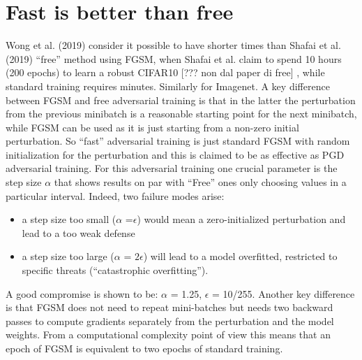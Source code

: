 \documentclass{article}
\begin{document}
\section{Fast is better than free}

Wong et al. (2019) consider it possible to have shorter times than Shafai et al. (2019) “free” method using FGSM,  when Shafai et al. claim to spend 10 hours (200 epochs) to learn a robust CIFAR10 [??? non dal paper di free] , while standard training requires minutes. Similarly for Imagenet.  
A key difference between FGSM and free adversarial training is that in the latter the perturbation from the previous minibatch is a reasonable starting point for the next minibatch, while FGSM can be used as it is just starting from a non-zero initial perturbation.
So “fast” adversarial training is just standard FGSM with random initialization for the perturbation and this is claimed to be as effective as PGD adversarial training.
For this adversarial training one crucial parameter is the step size $\alpha$ that shows results on par with “Free” ones only choosing values in a particular interval. Indeed, two failure modes arise: 
\begin{itemize}

\item a step size too small ($\alpha$ =$\epsilon$) would mean a zero-initialized perturbation and lead to a too weak defense
\item a step size too large ($\alpha$ = $2\epsilon$) will lead to a model overfitted, restricted to specific threats (“catastrophic overfitting”).
\end{itemize}

A good compromise is shown to be: $\alpha$ = 1.25, $\epsilon$ = 10/255.
Another key difference is that FGSM does not need to repeat mini-batches but needs two backward passes to compute gradients separately from the perturbation and the model weights. From a computational complexity point of view this means that an epoch of FGSM is equivalent to two epochs of standard training.
\end{document}

